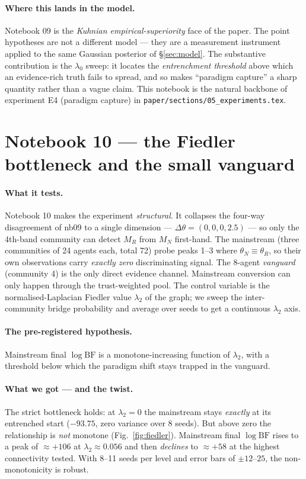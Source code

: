\documentclass[11pt,a4paper]{article}
\theoremstyle{plain}
\begin{document}
\paragraph{Where this lands in the model.} Notebook 09 is the
\emph{Kuhnian empirical-superiority} face of the paper. The point
hypotheses are not a different model --- they are a measurement
instrument applied to the same Gaussian posterior of §\ref{sec:model}.
The substantive contribution is the $\lambda_0$ sweep: it locates the
\emph{entrenchment threshold} above which an evidence-rich truth fails
to spread, and so makes ``paradigm capture'' a sharp quantity rather
than a vague claim. This notebook is the natural backbone of
experiment E4 (paradigm capture) in
\texttt{paper/sections/05\_experiments.tex}.

\section{Notebook 10 --- the Fiedler bottleneck and the small vanguard}
\label{sec:nb10}

\paragraph{What it tests.} Notebook 10 makes the experiment
\emph{structural}. It collapses the four-way disagreement of nb09 to a
single dimension --- $\Delta\theta=(0,0,0,2.5)$ --- so only the
4th-band community can detect $M_R$ from $M_N$ first-hand. The
mainstream (three communities of 24 agents each, total 72) probe peaks
1--3 where $\theta_N\equiv\theta_R$, so their own observations carry
\emph{exactly zero} discriminating signal. The 8-agent
\emph{vanguard} (community 4) is the only direct evidence channel.
Mainstream conversion can only happen through the trust-weighted pool.
The control variable is the normalised-Laplacian Fiedler value
$\lambda_2$ of the graph; we sweep the inter-community bridge
probability and average over seeds to get a continuous $\lambda_2$
axis.

\paragraph{The pre-registered hypothesis.} Mainstream final
$\log\mathrm{BF}$ is a monotone-increasing function of $\lambda_2$, with
a threshold below which the paradigm shift stays trapped in the
vanguard.

\paragraph{What we got --- and the twist.} The strict bottleneck holds:
at $\lambda_2=0$ the mainstream stays \emph{exactly} at its entrenched
start ($-93.75$, zero variance over 8 seeds). But above zero the
relationship is \emph{not} monotone (Fig.~\ref{fig:fiedler}).
Mainstream final $\log\mathrm{BF}$ rises to a peak of $\approx +106$ at
$\lambda_2\approx 0.056$ and then \emph{declines} to $\approx +58$ at
the highest connectivity tested. With 8--11 seeds per level and error
bars of $\pm 12$--$25$, the non-monotonicity is robust.
\end{document}
